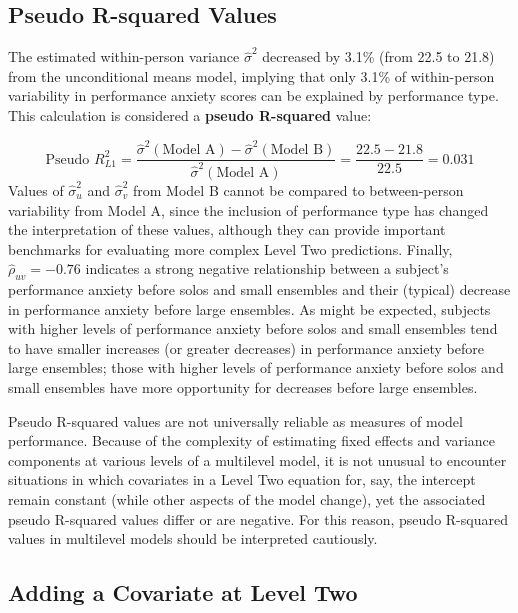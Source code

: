 \documentclass[
]{krantz}
\begin{document}
\hypertarget{pseudoR2}{%
\subsection{Pseudo R-squared Values}\label{pseudoR2}}

The estimated within-person variance \(\hat{\sigma}^2\) decreased by 3.1\% (from 22.5 to 21.8) from the unconditional means model, implying that only 3.1\% of within-person variability in performance anxiety scores can be explained by performance type. This calculation is considered a \textbf{pseudo R-squared}  value:

\begin{equation*}
\textrm{Pseudo }R^2_{L1} = \frac{\hat{\sigma}^{2}(\textrm{Model A})-\hat{\sigma}^{2}(\textrm{Model B})}{\hat{\sigma}^{2}(\textrm{Model A})} = \frac{22.5-21.8}{22.5} = 0.031
\end{equation*}
Values of \(\hat{\sigma}_{u}^{2}\) and \(\hat{\sigma}_{v}^{2}\) from Model B cannot be compared to between-person variability from Model A, since the inclusion of performance type has changed the interpretation of these values, although they can provide important benchmarks for evaluating more complex Level Two predictions. Finally, \(\hat{\rho}_{uv}=-0.76\) indicates a strong negative relationship between a subject's performance anxiety before solos and small ensembles and their (typical) decrease in performance anxiety before large ensembles. As might be expected, subjects with higher levels of performance anxiety before solos and small ensembles tend to have smaller increases (or greater decreases) in performance anxiety before large ensembles; those with higher levels of performance anxiety before solos and small ensembles have more opportunity for decreases before large ensembles.

Pseudo R-squared values are not universally reliable as measures of model performance. Because of the complexity of estimating fixed effects and variance components at various levels of a multilevel model, it is not unusual to encounter situations in which covariates in a Level Two equation for, say, the intercept remain constant (while other aspects of the model change), yet the associated pseudo R-squared values differ or are negative. For this reason, pseudo R-squared values in multilevel models should be interpreted cautiously.

\hypertarget{modelc}{%
\subsection{Adding a Covariate at Level Two}\label{modelc}}
\end{document}
